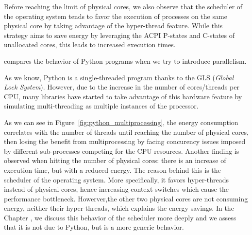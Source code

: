 
Before reaching the limit of physical cores, we also observe that the scheduler of the operating system tends to favor the execution of processes on the same physical core by taking advantage of the hyper-thread feature.
While this strategy aims to save energy by leveraging the ACPI P-states and C-states of unallocated cores, this leads to increased execution times.



 compares the behavior of Python programs when we try to introduce parallelism.

As we know, Python is a single-threaded program thanks to the GLS (\emph{Global Lock System}). However, due to the increase in the number of cores/threads per CPU, many libraries have started to take advantage of this hardware feature by simulating multi-threading as multiple instances of the processor.



As we can see in Figure~\ref{fig:python_multiprocessing}, the energy consumption correlates with the number of threads until reaching the number of physical cores, then losing the benefit from multiprocessing by facing concurency issues imposed by different sub-processes competing for the CPU resources.
Another finding is observed when hitting the number of physical cores: there is an increase of execution time, but with a reduced energy.
The reason behind this is the scheduler of the operating system.
More specifically, it favors hyper-threads instead of physical cores, hence increasing context switches which cause the performance bottleneck.
Howerver,the other two physical cores are not consuming energy, neither their hyper-threads, which explains the energy savings.
In the Chapter , %
we discuss this behavior of the scheduler more deeply and we assess that it is not due to Python, but is a more generic behavior.


